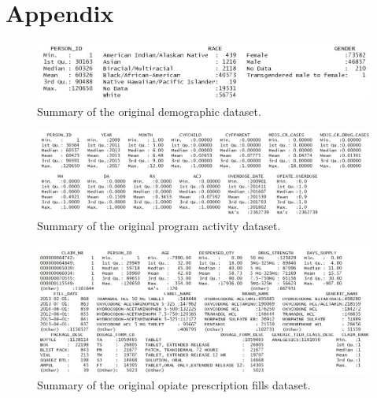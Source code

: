 \documentclass[twoside,10.5pt]{article}
\begin{document}
\newpage
\appendix
\section*{Appendix}

\begin{figure}[h!]
\begin{center}
\includegraphics[width=5in]{images/original_dem_summary.JPG}
\end{center}
\caption{Summary of the original demographic dataset.}
\label{fig:orig_dem}
\end{figure}

\begin{figure}[h!]
\begin{center}
\includegraphics[width=6in]{images/original_prog_summary.JPG}
\end{center}
\caption{Summary of the original program activity dataset.}
\label{fig:orig_prog}
\end{figure}

\begin{figure}[h!]
\begin{center}
\includegraphics[width=6in]{images/original_presc_summary.JPG}
\end{center}
\caption{Summary of the original opiate prescription fills dataset.}
\label{fig:orig_presc}
\end{figure}
\end{document}
